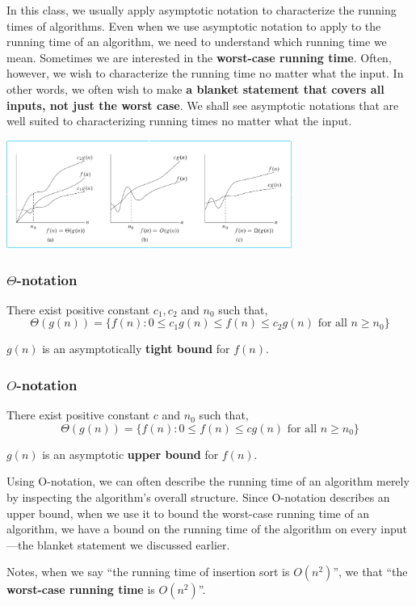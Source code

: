 \documentclass[en,hazy,blue,screen,14pt]{elegantnote}
\begin{document}
In this class, we usually apply asymptotic notation to characterize
the running times of algorithms. Even when we use asymptotic notation
to apply to the running time of an algorithm, we need to understand
which running time we mean. Sometimes we are interested in the \textbf{worst-case
running time}. Often, however, we wish to characterize the running
time no matter what the input. In other words, we often wish to make
\textbf{a blanket statement that covers all inputs, not just the worst
case}. We shall see asymptotic notations that are well suited to characterizing
running times no matter what the input.

\centerline{\includegraphics[width=0.7\textwidth]{asymptotic-notion}}

\subsubsection*{$\Theta$-notation}
There exist positive constant $c_{1},c_{2}$ and $n_{0}$ such that,
\[
\Theta(g(n))=\{f(n): 0\le c_{1}g(n)\le f(n)\le c_{2}g(n)\text{ for all 
}n\ge n_{0}\}
\]

$g(n)$ is an asymptotically \textbf{tight bound} for $f(n)$.

\subsubsection*{$O$-notation}
There exist positive constant $c$ and $n_{0}$ such that,
\[
\Theta(g(n))=\{f(n):0\le f(n)\le cg(n)\text{ for all }n\ge n_{0}\}
\]

$g(n)$ is an asymptotic \textbf{upper bound} for $f(n)$.

Using O-notation, we can often describe the running time of an algorithm
merely by inspecting the algorithm\textquoteright s overall structure.
Since O-notation describes an upper bound, when we use it to bound
the worst-case running time of an algorithm, we have a bound on the
running time of the algorithm on every input---the blanket statement
we discussed earlier. 

Notes, when we say ``the running time of insertion sort is $O(n^{2})$'',
we that ``the \textbf{worst-case running time} is $O(n^{2})$''.
\end{document}
